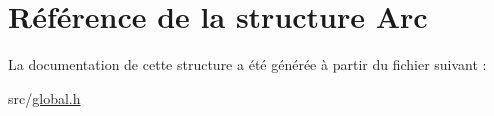 \hypertarget{struct_arc}{}\section{Référence de la structure Arc}
\label{struct_arc}


La documentation de cette structure a été générée à partir du fichier suivant \+:\begin{DoxyCompactItemize}
\item 
src/\mbox{\hyperlink{global_8h}{global.\+h}}\end{DoxyCompactItemize}
